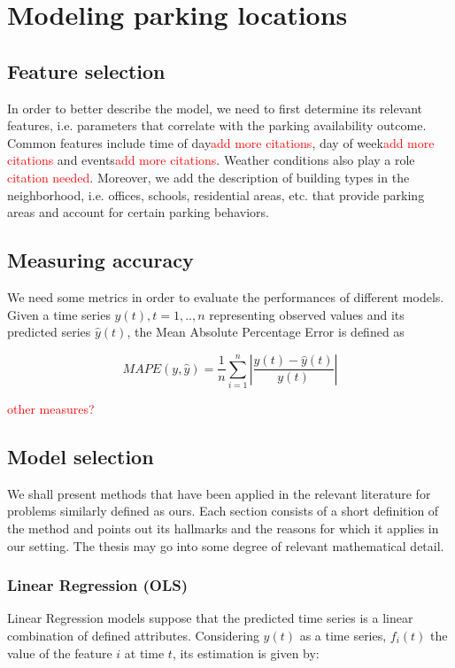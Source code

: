 \documentclass{article}
\newcommand\mytodo[1]{\textcolor{red}{#1}}
\begin{document}
\section{Modeling parking locations}
\subsection{Feature selection}
In order to better describe the model, we need to first determine its relevant features, i.e. parameters that correlate with the parking availability outcome. Common features include time of day\cite{Chen}\mytodo{add more citations}, day of week\cite{Chen}\mytodo{add more citations} and events\cite{Chen}\mytodo{add more citations}. Weather conditions also play a role \mytodo{citation needed}. Moreover, we add the description of building types in the neighborhood, i.e. offices, schools, residential areas, etc. that provide parking areas and account for certain parking behaviors.

\subsection{Measuring accuracy}
We need some metrics in order to evaluate the performances of different models. Given a time series 
$y(t), t=1,..,n$ representing observed values and its predicted series $\hat{y}(t)$, the Mean Absolute Percentage Error is defined as \cite{Chen}\cite{Rajabioun}

$$MAPE(y, \hat{y}) = \frac{1}{n}\sum_{i=1}^{n}|\frac{y(t) - \hat{y}(t)}{y(t)}|$$

\mytodo{other measures?}

\subsection{Model selection}
We shall present methods that have been applied in the relevant literature for problems similarly defined as ours. Each section consists of a short definition of the method and points out its hallmarks and the reasons for which it applies in our setting. The thesis may go into some degree of relevant mathematical detail.

\subsubsection{Linear Regression (OLS)}
Linear Regression models suppose that the predicted time series is a linear combination of defined attributes. Considering $y(t)$ as a time series, $f_i(t)$ the value of the feature $i$ at time $t$, its estimation is given by:
\end{document}
